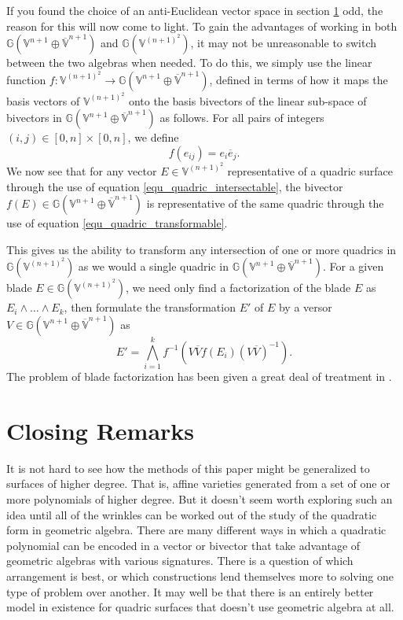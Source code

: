 \documentclass{birkjour}
\theoremstyle{definition}
\theoremstyle{remark}
\numberwithin{equation}{section}
\newcommand{\G}{\mathbb{G}}
\newcommand{\V}{\mathbb{V}}
\newcommand{\Vb}{\mathbb{\overline{V}}}
\begin{document}

If you found the choice of an anti-Euclidean vector
space in section \ref{} odd, the reason for this will
now come to light.  To gain the advantages of working
in both $\G(\V^{n+1}\oplus\Vb^{n+1})$ and $\G(\V^{(n+1)^2})$,
it may not be unreasonable to switch between the two
algebras when needed.  To do this, we simply use the linear
function $f:\V^{(n+1)^2}\to\G(\V^{n+1}\oplus\Vb^{n+1})$,
defined in terms of how it maps the basis vectors of $\V^{(n+1)^2}$ onto the
basis bivectors of the linear sub-space of bivectors in $\G(\V^{n+1}\oplus\Vb^{n+1})$ as follows.
For all pairs of integers $(i,j)\in[0,n]\times[0,n]$, we define
\begin{equation}
f(e_{ij})=e_i\overline{e}_j.
\end{equation}
We now see that for any vector $E\in\V^{(n+1)^2}$ representative of
a quadric surface through the use of equation \eqref{equ_quadric_intersectable}, the bivector
$f(E)\in\G(\V^{n+1}\oplus\Vb^{n+1})$ is representative of the same
quadric through the use of equation \eqref{equ_quadric_transformable}.

This gives us the ability to transform any intersection of one or more quadrics
in $\G(\V^{(n+1)^2})$ as we would a single quadric in $\G(\V^{n+1}\oplus\Vb^{n+1})$.
For a given blade $E\in\G(\V^{(n+1)^2})$, we need only find a factorization
of the blade $E$ as $E_i\wedge\dots\wedge E_k$, then formulate the transformation $E'$
of $E$ by a versor $V\in\G(\V^{n+1}\oplus\Vb^{n+1})$ as
\begin{equation}
E' = \bigwedge_{i=1}^k f^{-1}\left(V\overline{V}f(E_i)(V\overline{V})^{-1}\right).
\end{equation}
The problem of blade factorization has been given a great deal of treatment in \cite{}.

\section{Closing Remarks}

It is not hard to see how the methods of this paper might be generalized
to surfaces of higher degree.  That is, affine varieties generated from a
set of one or more polynomials of higher degree.  But it doesn't seem worth
exploring such an idea until all of the wrinkles can be worked out of the study
of the quadratic form in geometric algebra.  There are many different ways
in which a quadratic polynomial can be encoded in a vector or bivector that
take advantage of geometric algebras with various signatures.  There is a question
of which arrangement is best, or which constructions lend themselves more to solving
one type of problem over another.  It may well be that there is an entirely
better model in existence for quadric surfaces that doesn't use geometric algebra at all.
\end{document}
